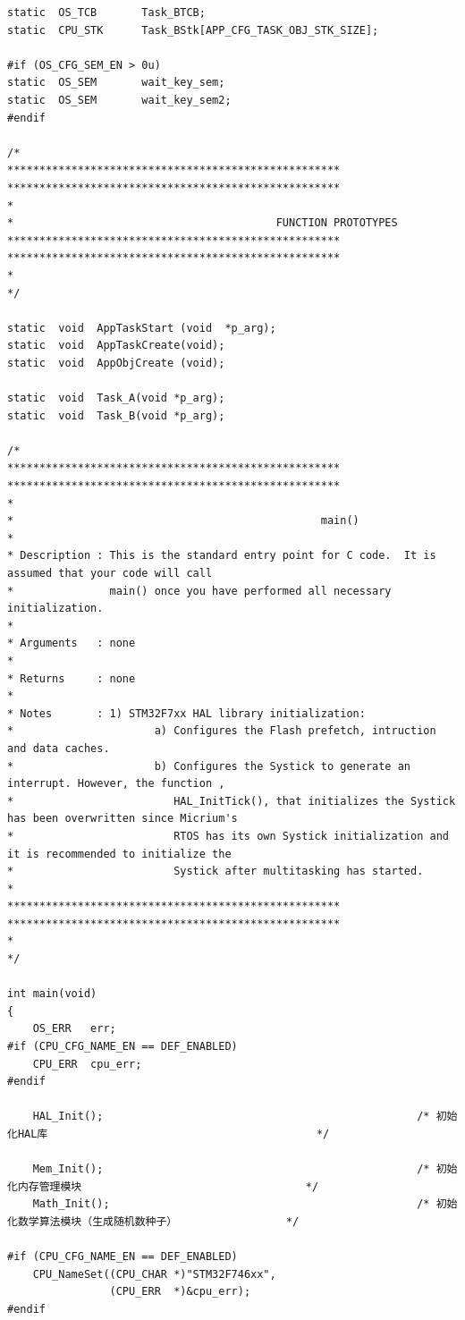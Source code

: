 ﻿\documentclass[UTF8,12pt]{article}
\begin{document}
\begin{lstlisting}[frame=shadowbox]
static  OS_TCB       Task_BTCB;
static  CPU_STK      Task_BStk[APP_CFG_TASK_OBJ_STK_SIZE];

#if (OS_CFG_SEM_EN > 0u)
static  OS_SEM       wait_key_sem;
static  OS_SEM       wait_key_sem2;
#endif

/*
****************************************************
****************************************************
*
*                                         FUNCTION PROTOTYPES
****************************************************
****************************************************
*
*/

static  void  AppTaskStart (void  *p_arg);
static  void  AppTaskCreate(void);
static  void  AppObjCreate (void);

static  void  Task_A(void *p_arg);
static  void  Task_B(void *p_arg);

/*
****************************************************
****************************************************
*
*                                                main()
*
* Description : This is the standard entry point for C code.  It is assumed that your code will call
*               main() once you have performed all necessary initialization.
*
* Arguments   : none
*
* Returns     : none
*
* Notes       : 1) STM32F7xx HAL library initialization:
*                      a) Configures the Flash prefetch, intruction and data caches.
*                      b) Configures the Systick to generate an interrupt. However, the function ,
*                         HAL_InitTick(), that initializes the Systick has been overwritten since Micrium's
*                         RTOS has its own Systick initialization and it is recommended to initialize the
*                         Systick after multitasking has started.
*
****************************************************
****************************************************
*
*/

int main(void)
{
    OS_ERR   err;
#if (CPU_CFG_NAME_EN == DEF_ENABLED)
    CPU_ERR  cpu_err;
#endif

    HAL_Init();                                                 /* 初始化HAL库                                          */

    Mem_Init();                                                 /* 初始化内存管理模块                                   */
    Math_Init();                                                /* 初始化数学算法模块（生成随机数种子）                 */

#if (CPU_CFG_NAME_EN == DEF_ENABLED)
    CPU_NameSet((CPU_CHAR *)"STM32F746xx",
                (CPU_ERR  *)&cpu_err);
#endif


\end{lstlisting}
\end{document}
